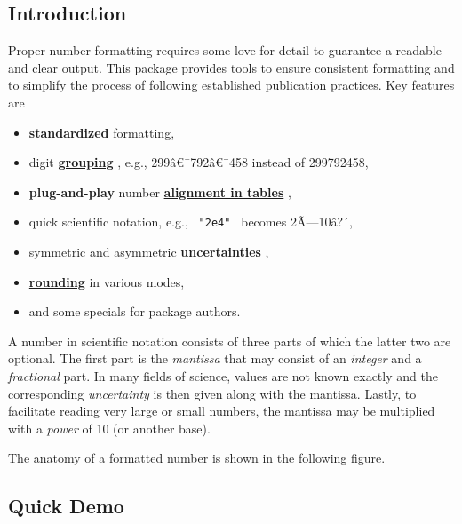 \subsection{Introduction}\label{introduction}

Proper number formatting requires some love for detail to guarantee a
readable and clear output. This package provides tools to ensure
consistent formatting and to simplify the process of following
established publication practices. Key features are

\begin{itemize}
\tightlist
\item
  \textbf{standardized} formatting,
\item
  digit
  \href{https://github.com/typst/packages/raw/main/packages/preview/zero/0.3.0/\#grouping}{\textbf{grouping}}
  , e.g., 299â€¯792â€¯458 instead of 299792458,
\item
  \textbf{plug-and-play} number
  \href{https://github.com/typst/packages/raw/main/packages/preview/zero/0.3.0/\#table-alignment}{\textbf{alignment
  in tables}} ,
\item
  quick scientific notation, e.g., \texttt{\ "2e4"\ } becomes
  2Ã---10â?´,
\item
  symmetric and asymmetric
  \href{https://github.com/typst/packages/raw/main/packages/preview/zero/0.3.0/\#specifying-uncertainties}{\textbf{uncertainties}}
  ,
\item
  \href{https://github.com/typst/packages/raw/main/packages/preview/zero/0.3.0/\#rounding}{\textbf{rounding}}
  in various modes,
\item
  and some specials for package authors.
\end{itemize}

A number in scientific notation consists of three parts of which the
latter two are optional. The first part is the \emph{mantissa} that may
consist of an \emph{integer} and a \emph{fractional} part. In many
fields of science, values are not known exactly and the corresponding
\emph{uncertainty} is then given along with the mantissa. Lastly, to
facilitate reading very large or small numbers, the mantissa may be
multiplied with a \emph{power} of 10 (or another base).

The anatomy of a formatted number is shown in the following figure.


\subsection{Quick Demo}\label{quick-demo}

